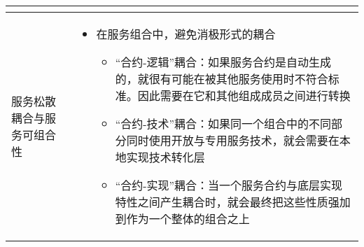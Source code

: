 \begin{longtable}{|m{3cm}<{\centering}|m{12cm}|}
\begin{itemize}[leftmargin=1.5em,itemsep=-3pt,topsep=-3pt]
    \vspace{-1.5em}
    \end{itemize}  
    \\ \hline
    服务松散耦合与服务可组合性
    & 
    \vspace{-1.3em}
    \begin{itemize}[leftmargin=1.5em,itemsep=-3pt,topsep=-3pt]
        \item 在服务组合中，避免消极形式的耦合
        \begin{itemize}[leftmargin=1.5em,itemsep=-3pt,topsep=-3pt]
            \item “合约-逻辑”耦合：如果服务合约是自动生成的，就很有可能在被其他服务使用时不符合标准。因此需要在它和其他组成成员之间进行转换
            \item “合约-技术”耦合：如果同一个组合中的不同部分同时使用开放与专用服务技术，就会需要在本地实现技术转化层
            \item “合约-实现”耦合：当一个服务合约与底层实现特性之间产生耦合时，就会最终把这些性质强加到作为一个整体的组合之上
        \end{itemize} 
    \vspace{-1.2em}
    \end{itemize}  
    \\ \hline
\end{longtable}